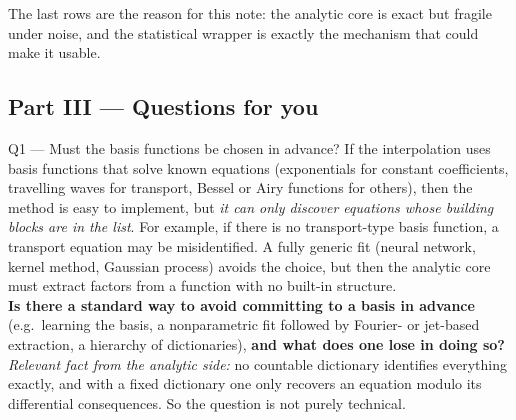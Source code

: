 The last rows are the reason for this note: the analytic core is exact but fragile under noise, and the statistical wrapper is exactly the mechanism that could make it usable.

\subsection*{Part III --- Questions for you}

\begin{askbox}{Q1 --- Must the basis functions be chosen in advance?}
If the interpolation uses basis functions that solve known equations (exponentials for constant coefficients, travelling waves for transport, Bessel or Airy functions for others), then the method is easy to implement, but \emph{it can only discover equations whose building blocks are in the list}. For example, if there is no transport-type basis function, a transport equation may be misidentified. A fully generic fit (neural network, kernel method, Gaussian process) avoids the choice, but then the analytic core must extract factors from a function with no built-in structure.\\[3pt]
\textbf{Is there a standard way to avoid committing to a basis in advance} (e.g.\ learning the basis, a nonparametric fit followed by Fourier- or jet-based extraction, a hierarchy of dictionaries), \textbf{and what does one lose in doing so?}\\[3pt]
\emph{Relevant fact from the analytic side:} no countable dictionary identifies everything exactly, and with a fixed dictionary one only recovers an equation modulo its differential consequences. So the question is not purely technical.
\end{askbox}

